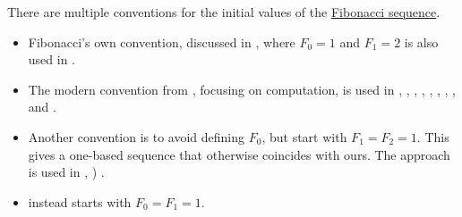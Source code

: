 \begin{remark}\label{rem:fibonacci_sequence_initial_value}
  There are multiple conventions for the initial values of the \hyperref[def:fibonacci_numbers]{Fibonacci sequence}.

  \begin{itemize}
    \item Fibonacci's own convention, discussed in , where \( F_0 = 1 \) and \( F_1 = 2 \) is also used in \cite[exerc. 5.5]{Treil2017LinearAlgebraDoneWrong}.

    \item The modern convention from , focusing on computation, is used in
    \cite[98]{Aigner1997CombinatorialTheory},
    \cite[467]{LidlNiederreiter1997FiniteFields},
    \cite[def. 2.4.5]{Rosen2019DiscreteMathematics},
    \cite[112]{ConwayGuy1998BookOfNumbers},
    \cite[122]{Mimram2020ProgramEqualsProof},
    \cite[98]{Erickson2019Algorithms},
    \cite[13]{Knuth1997ArtVol1},
    \cite[exerc. B-5.14(ii)]{Rotman2015AdvancedModernAlgebraPart1},
    \cite[59]{Мальцев1986Алгоритмы} and
    \cite[\S 5.7.3]{Новиков2013ДискретнаяМатематика}.

    \item Another convention is to avoid defining \( F_0 \), but start with \( F_1 = F_2 = 1 \). This gives a one-based sequence that otherwise coincides with ours. The approach is used in
    \cite[273]{Deza2012FigurateNumbers},
    \cite[example 1.1.12]{Stanley2012EnumerativeCombinatoricsVol1}
    \cite[exerc. 7.15]{ГашковЧубариков2005СложностьВычисления})
    \cite[97]{Зорич2019АнализЧасть1}.

    \item {} instead starts with \( F_0 = F_1 = 1 \).
  \end{itemize}
\end{remark}

